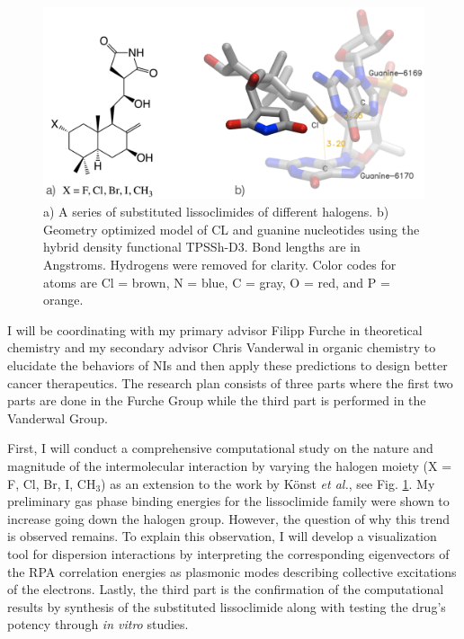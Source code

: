 \documentclass[11pt]{article}
\begin{document}
\begin{figure}
  \vspace{-33pt}
  \centering
  \includegraphics[scale=0.12]{combined.png}
  \caption{a) A series of substituted lissoclimides of different halogens.
    b) Geometry optimized model of CL and guanine nucleotides using the hybrid
    density functional TPSSh-D3.\autocite{Staroverov03JChemPhys119p12129,Grimme12ChemEurJ18p9955}
    Bond lengths are in Angstroms. Hydrogens were removed for clarity. Color codes
    for atoms are Cl = brown, N = blue, C = gray, O = red, and P = orange.\vspace{-11pt}}
  \label{fig:model}
\end{figure}

I will be coordinating with my primary advisor Filipp Furche in
theoretical chemistry and my secondary advisor Chris Vanderwal in organic
chemistry to elucidate the behaviors of NIs and then apply these predictions
to design better cancer therapeutics. The research plan consists of three
parts where the first two parts are done in the Furche Group while the third
part is performed in the Vanderwal Group.

First, I will conduct a comprehensive computational study on the nature
and magnitude of the intermolecular interaction by varying the halogen
moiety (X = F, Cl, Br, I, CH$_3$) as an extension to the work by K{\"o}nst
\textit{et al.},\autocite{Konst2017} see Fig. \ref{fig:model}. My preliminary
gas phase binding energies for the lissoclimide family were shown to increase
going down the halogen group. However, the question of why this trend
is observed remains. To explain this observation, I will develop a visualization
tool for dispersion interactions by interpreting the corresponding eigenvectors of
the RPA correlation energies as plasmonic modes describing collective excitations
of the electrons. Lastly, the third part is the confirmation of the computational
results by synthesis of the substituted lissoclimide along with testing
the drug's potency through \textit{in vitro} studies.
\end{document}
